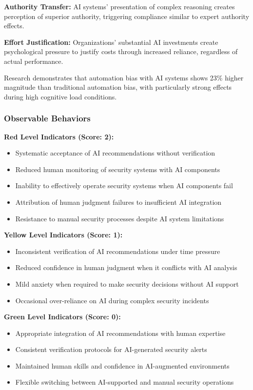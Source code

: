 \documentclass[11pt,a4paper]{article}
\begin{document}
\textbf{Authority Transfer:} AI systems' presentation of complex reasoning creates perception of superior authority, triggering compliance similar to expert authority effects\cite{milgram1974}.

\textbf{Effort Justification:} Organizations' substantial AI investments create psychological pressure to justify costs through increased reliance, regardless of actual performance\cite{festinger1957}.

Research demonstrates that automation bias with AI systems shows 23\% higher magnitude than traditional automation bias, with particularly strong effects during high cognitive load conditions\cite{automation2024}.

\subsubsection{Observable Behaviors}

\textbf{Red Level Indicators (Score: 2):}
\begin{itemize}
\item Systematic acceptance of AI recommendations without verification
\item Reduced human monitoring of security systems with AI components
\item Inability to effectively operate security systems when AI components fail
\item Attribution of human judgment failures to insufficient AI integration
\item Resistance to manual security processes despite AI system limitations
\end{itemize}

\textbf{Yellow Level Indicators (Score: 1):}
\begin{itemize}
\item Inconsistent verification of AI recommendations under time pressure
\item Reduced confidence in human judgment when it conflicts with AI analysis
\item Mild anxiety when required to make security decisions without AI support
\item Occasional over-reliance on AI during complex security incidents
\end{itemize}

\textbf{Green Level Indicators (Score: 0):}
\begin{itemize}
\item Appropriate integration of AI recommendations with human expertise
\item Consistent verification protocols for AI-generated security alerts
\item Maintained human skills and confidence in AI-augmented environments
\item Flexible switching between AI-supported and manual security operations
\end{itemize}
\end{document}
